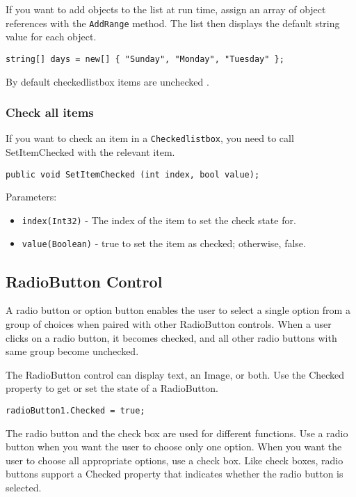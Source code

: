 If you want to add objects to the list at run time, assign an array of object references with the \texttt{AddRange} method. The list then displays the default string value for each object.

\begin{lstlisting}[numbers=none]
string[] days = new[] { "Sunday", "Monday", "Tuesday" };
\end{lstlisting}
 By default checkedlistbox items are unchecked .

\subsubsection*{Check all items}
If you want to check an item in a \texttt{Checkedlistbox}, you need to call SetItemChecked with the relevant item.

\begin{lstlisting}[numbers=none]
public void SetItemChecked (int index, bool value);
\end{lstlisting}

Parameters:
\begin{itemize}
	\item \verb*|index(Int32)| - The index of the item to set the check state for.
	\item \verb*|value(Boolean)| - true to set the item as checked; otherwise, false.
\end{itemize}

\subsection{RadioButton Control }
A radio button or option button enables the user to select a single option from a group of choices when paired with other RadioButton controls. When a user clicks on a radio button, it becomes checked, and all other radio buttons with same group become unchecked.

The RadioButton control can display text, an Image, or both. Use the Checked property to get or set the state of a RadioButton.

\begin{lstlisting}[numbers=none]
radioButton1.Checked = true;
\end{lstlisting}

The radio button and the check box are used for different functions. Use a radio button when you want the user to choose only one option. When you want the user to choose all appropriate options, use a check box. Like check boxes, radio buttons support a Checked property that indicates whether the radio button is selected.

